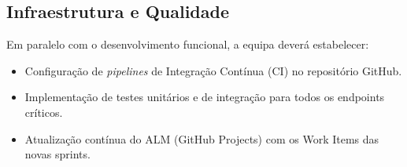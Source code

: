 \documentclass[12pt,a4paper]{report}
\begin{document}
\subsection{Infraestrutura e Qualidade}
Em paralelo com o desenvolvimento funcional, a equipa deverá estabelecer:
\begin{itemize}
    \item Configuração de \textit{pipelines} de Integração Contínua (CI) no repositório GitHub.
    \item Implementação de testes unitários e de integração para todos os endpoints críticos.
    \item Atualização contínua do ALM (GitHub Projects) com os Work Items das novas sprints.
\end{itemize}
\end{document}
